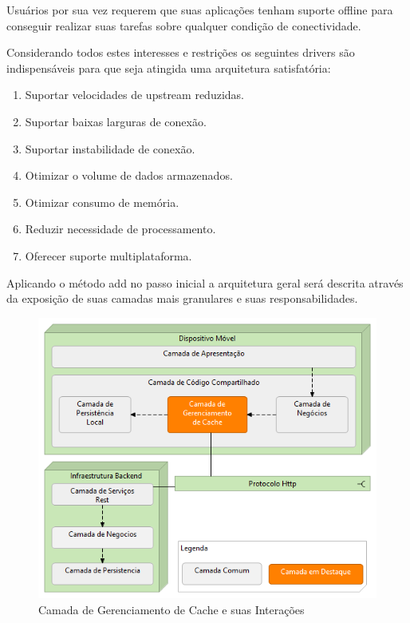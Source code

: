 \documentclass[
	article,			%
	11pt,				%
	oneside,			%
	a4paper,			%
	english,			%
	brazil,				%
	sumario=tradicional
]{abntex2}
\begin{document}
Usuários por sua vez requerem que suas aplicações tenham suporte offline para conseguir realizar suas tarefas sobre qualquer condição de conectividade.

Considerando todos estes interesses e restrições os seguintes drivers são indispensáveis para que seja atingida uma arquitetura satisfatória:
\begin{enumerate}
	\item Suportar velocidades de upstream reduzidas.
	\item Suportar baixas larguras de conexão.
	\item Suportar instabilidade de conexão.
	\item Otimizar o volume de dados armazenados.
	\item Otimizar consumo de memória.
	\item Reduzir necessidade de processamento.
	\item Oferecer suporte multiplataforma.	
\end{enumerate}


Aplicando o método \gls{add} no passo inicial a arquitetura geral será descrita através da exposição de suas camadas mais granulares e suas responsabilidades.

\begin{figure}[H]
	\centering
	\includegraphics[scale=0.7]{images/CamadasNivel0}
	\caption{Camada de Gerenciamento de Cache e suas Interações}
\end{figure}
\end{document}
